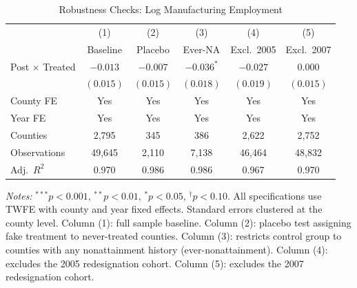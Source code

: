 \begin{table}[t]
\centering
\caption{Robustness Checks: Log Manufacturing Employment}
\label{tab:robustness}
\begin{tabular}{lccccc}
\toprule
 & (1) & (2) & (3) & (4) & (5) \\
 & Baseline & Placebo & Ever-NA & Excl.\ 2005 & Excl.\ 2007 \\
\midrule
Post $\times$ Treated & $-0.013$ & $-0.007$ & $-0.036^{*}$ & $-0.027$ & $0.000$ \\
 & $(0.015)$ & $(0.015)$ & $(0.018)$ & $(0.019)$ & $(0.015)$ \\
\midrule
County FE & Yes & Yes & Yes & Yes & Yes \\
Year FE & Yes & Yes & Yes & Yes & Yes \\
Counties & 2,795 & 345 & 386 & 2,622 & 2,752 \\
Observations & 49,645 & 2,110 & 7,138 & 46,464 & 48,832 \\
Adj.\ $R^2$ & 0.970 & 0.986 & 0.986 & 0.967 & 0.970 \\
\bottomrule
\end{tabular}

\vspace{0.3em}
{\small \textit{Notes:} $^{***}p<0.001$, $^{**}p<0.01$, $^{*}p<0.05$, $^{\dagger}p<0.10$. All specifications use TWFE with county and year fixed effects. Standard errors clustered at the county level. Column (1): full sample baseline. Column (2): placebo test assigning fake treatment to never-treated counties. Column (3): restricts control group to counties with any nonattainment history (ever-nonattainment). Column (4): excludes the 2005 redesignation cohort. Column (5): excludes the 2007 redesignation cohort.}
\end{table}

